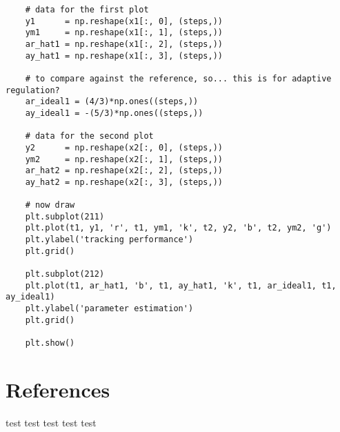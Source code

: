 \documentclass{article}
\begin{document}
\begin{lstlisting}
    # data for the first plot
    y1      = np.reshape(x1[:, 0], (steps,))
    ym1     = np.reshape(x1[:, 1], (steps,))
    ar_hat1 = np.reshape(x1[:, 2], (steps,))
    ay_hat1 = np.reshape(x1[:, 3], (steps,))

    # to compare against the reference, so... this is for adaptive regulation?
    ar_ideal1 = (4/3)*np.ones((steps,))
    ay_ideal1 = -(5/3)*np.ones((steps,))

    # data for the second plot
    y2      = np.reshape(x2[:, 0], (steps,))
    ym2     = np.reshape(x2[:, 1], (steps,))
    ar_hat2 = np.reshape(x2[:, 2], (steps,))
    ay_hat2 = np.reshape(x2[:, 3], (steps,))

    # now draw
    plt.subplot(211)
    plt.plot(t1, y1, 'r', t1, ym1, 'k', t2, y2, 'b', t2, ym2, 'g')
    plt.ylabel('tracking performance')
    plt.grid()

    plt.subplot(212)
    plt.plot(t1, ar_hat1, 'b', t1, ay_hat1, 'k', t1, ar_ideal1, t1, ay_ideal1)
    plt.ylabel('parameter estimation')
    plt.grid()

    plt.show()
\end{lstlisting}


\section{References}
\cite{ruiter} test
\cite{dirac} test
\cite{Markley} test
\cite{einstein} test
\cite{knuth-fa} test
\medskip
\printbibliography
\end{document}
